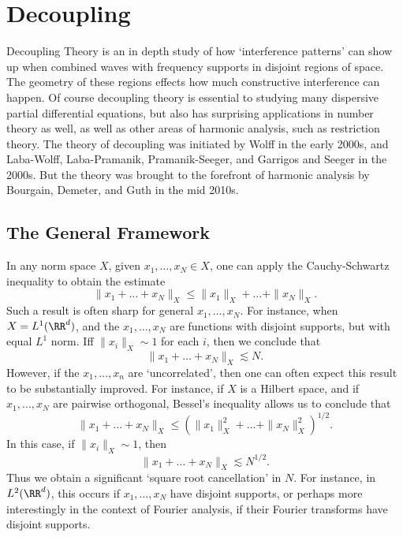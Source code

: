 
\part{Decoupling}

Decoupling Theory is an in depth study of how `interference patterns' can show up when combined waves with frequency supports in disjoint regions of space. The geometry of these regions effects how much constructive interference can happen. Of course decoupling theory is essential to studying many dispersive partial differential equations, but also has surprising applications in number theory as well, as well as other areas of harmonic analysis, such as restriction theory. The theory of decoupling was initiated by Wolff in the early 2000s, and Laba-Wolff, Laba-Pramanik, Pramanik-Seeger, and Garrigos and Seeger in the 2000s. But the theory was brought to the forefront of harmonic analysis by Bourgain, Demeter, and Guth in the mid 2010s.








\chapter{The General Framework}

In any norm space $X$, given $x_1, \dots, x_N \in X$, one can apply the Cauchy-Schwartz inequality to obtain the estimate
%
\[ \| x_1 + \dots + x_N \|_X \leq \| x_1 \|_X + \dots + \| x_N \|_X. \]
%
Such a result is often sharp for general $x_1, \dots, x_N$. For instance, when $X = L^1(\RR^d)$, and the $x_1, \dots, x_N$ are functions with disjoint supports, but with equal $L^1$ norm. Iff $\| x_i \|_X \sim 1$ for each $i$, then we conclude that
%
\[ \| x_1 + \dots + x_N \|_X \lesssim N. \]
%
However, if the $x_1, \dots, x_n$ are `uncorrelated', then one can often expect this result to be substantially improved. For instance, if $X$ is a Hilbert space, and if $x_1, \dots, x_N$ are pairwise orthogonal, Bessel's inequality allows us to conclude that
%
\[ \| x_1 + \dots + x_N \|_X \leq \left( \| x_1 \|_X^2 + \dots + \| x_N \|_X^2 \right)^{1/2}. \]
%
In this case, if $\| x_i \|_X \sim 1$, then
%
\[ \| x_1 + \dots + x_N \|_X \lesssim N^{1/2}. \]
%
Thus we obtain a significant `square root cancellation' in $N$. For instance, in $L^2(\RR^d)$, this occurs if $x_1, \dots, x_N$ have disjoint supports, or perhaps more interestingly in the context of Fourier analysis, if their Fourier transforms have disjoint supports.

